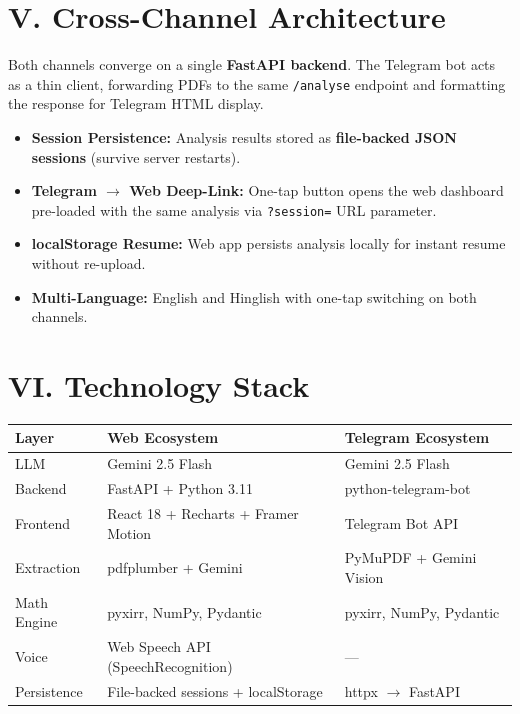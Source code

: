 \documentclass[9pt,a4paper]{article}
\begin{document}
\section{V. Cross-Channel Architecture}

\begin{tcolorbox}[colback=lightbg,colframe=highlight,boxsep=1pt,left=4pt,right=4pt,top=2pt,bottom=2pt]
\small Both channels converge on a single \textbf{FastAPI backend}. The Telegram bot acts as a thin client, forwarding PDFs to the same \texttt{/analyse} endpoint and formatting the response for Telegram HTML display.
\end{tcolorbox}

\begin{itemize}[leftmargin=*,nosep]
    \item \textbf{Session Persistence:} Analysis results stored as \textbf{file-backed JSON sessions} (survive server restarts).
    \item \textbf{Telegram $\rightarrow$ Web Deep-Link:} One-tap button opens the web dashboard pre-loaded with the same analysis via \texttt{?session=} URL parameter.
    \item \textbf{localStorage Resume:} Web app persists analysis locally for instant resume without re-upload.
    \item \textbf{Multi-Language:} English and Hinglish with one-tap switching on both channels.
\end{itemize}

\section{VI. Technology Stack}

\begin{table}[H]
\centering
\small
\setlength{\tabcolsep}{4pt}
\begin{tabularx}{0.95\textwidth}{lXX}
\toprule
\textbf{Layer} & \textbf{Web Ecosystem} & \textbf{Telegram Ecosystem} \\
\midrule
LLM & Gemini 2.5 Flash & Gemini 2.5 Flash \\
Backend & FastAPI + Python 3.11 & python-telegram-bot \\
Frontend & React 18 + Recharts + Framer Motion & Telegram Bot API \\
Extraction & pdfplumber + Gemini & PyMuPDF + Gemini Vision \\
Math Engine & pyxirr, NumPy, Pydantic & pyxirr, NumPy, Pydantic \\
Voice & Web Speech API (SpeechRecognition) & --- \\
Persistence & File-backed sessions + localStorage & httpx $\rightarrow$ FastAPI \\
\bottomrule
\end{tabularx}
\end{table}
\end{document}
